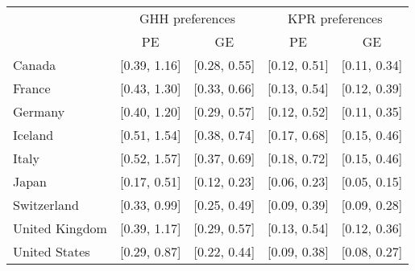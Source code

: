 \begin{tabular}{lcccc} 
& \multicolumn{2}{c}{GHH preferences}   & \multicolumn{2}{c}{KPR preferences}   \tabularnewline 
& PE                & GE                & PE                & GE                \tabularnewline 
\hline 
\hline 
Canada & {[}0.39, 1.16{]} & {[}0.28, 0.55{]} & {[}0.12, 0.51{]} & {[}0.11, 0.34{]} \tabularnewline 
France & {[}0.43, 1.30{]} & {[}0.33, 0.66{]} & {[}0.13, 0.54{]} & {[}0.12, 0.39{]} \tabularnewline 
Germany & {[}0.40, 1.20{]} & {[}0.29, 0.57{]} & {[}0.12, 0.52{]} & {[}0.11, 0.35{]} \tabularnewline 
Iceland & {[}0.51, 1.54{]} & {[}0.38, 0.74{]} & {[}0.17, 0.68{]} & {[}0.15, 0.46{]} \tabularnewline 
Italy & {[}0.52, 1.57{]} & {[}0.37, 0.69{]} & {[}0.18, 0.72{]} & {[}0.15, 0.46{]} \tabularnewline 
Japan & {[}0.17, 0.51{]} & {[}0.12, 0.23{]} & {[}0.06, 0.23{]} & {[}0.05, 0.15{]} \tabularnewline 
Switzerland & {[}0.33, 0.99{]} & {[}0.25, 0.49{]} & {[}0.09, 0.39{]} & {[}0.09, 0.28{]} \tabularnewline 
United Kingdom & {[}0.39, 1.17{]} & {[}0.29, 0.57{]} & {[}0.13, 0.54{]} & {[}0.12, 0.36{]} \tabularnewline 
United States & {[}0.29, 0.87{]} & {[}0.22, 0.44{]} & {[}0.09, 0.38{]} & {[}0.08, 0.27{]} \tabularnewline 
\hline 
\end{tabular} 
